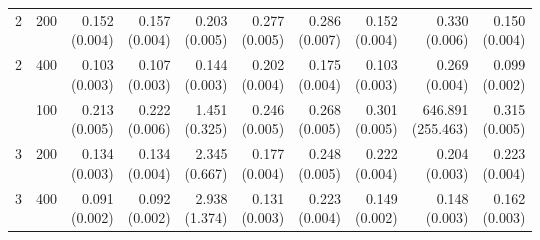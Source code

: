 \begin{table}[p]
{\begin{tabular}{llrrrrrrrr}
2 & 200 & \shortstack{0.152\\(0.004)} & \shortstack{0.157\\(0.004)} & \shortstack{0.203\\(0.005)} & \shortstack{0.277\\(0.005)} & \shortstack{0.286\\(0.007)} & \shortstack{0.152\\(0.004)} & \shortstack{0.330\\(0.006)} & \shortstack{0.150\\(0.004)} \\
2 & 400 & \shortstack{0.103\\(0.003)} & \shortstack{0.107\\(0.003)} & \shortstack{0.144\\(0.003)} & \shortstack{0.202\\(0.004)} & \shortstack{0.175\\(0.004)} & \shortstack{0.103\\(0.003)} & \shortstack{0.269\\(0.004)} & \shortstack{0.099\\(0.002)} \\
\addlinespace
3 & 100 & \shortstack{0.213\\(0.005)} & \shortstack{0.222\\(0.006)} & \shortstack{1.451\\(0.325)} & \shortstack{0.246\\(0.005)} & \shortstack{0.268\\(0.005)} & \shortstack{0.301\\(0.005)} & \shortstack{646.891\\(255.463)} & \shortstack{0.315\\(0.005)} \\
3 & 200 & \shortstack{0.134\\(0.003)} & \shortstack{0.134\\(0.004)} & \shortstack{2.345\\(0.667)} & \shortstack{0.177\\(0.004)} & \shortstack{0.248\\(0.005)} & \shortstack{0.222\\(0.004)} & \shortstack{0.204\\(0.003)} & \shortstack{0.223\\(0.004)} \\
3 & 400 & \shortstack{0.091\\(0.002)} & \shortstack{0.092\\(0.002)} & \shortstack{2.938\\(1.374)} & \shortstack{0.131\\(0.003)} & \shortstack{0.223\\(0.004)} & \shortstack{0.149\\(0.002)} & \shortstack{0.148\\(0.003)} & \shortstack{0.162\\(0.003)} \\

\end{tabular}}
\end{table}
